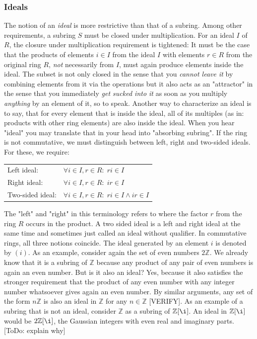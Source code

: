 \subsubsection{Ideals}
The notion of an \emph{ideal} is more restrictive than that of a subring. Among other requirements, a subring $S$ must be closed under multiplication. For an ideal $I$ of $R$, the closure under multiplication requirement is tightened: It must be the case that the products of elements $i \in I$ from the ideal $I$ with elements $r \in R$ from the original ring $R$, \emph{not} necessarily from $I$, must again produce elements inside the ideal. The subset is not only closed in the sense that you \emph{cannot leave it} by combining elements from it via the operations but it also acts as an "attractor" in the sense that you immediately \emph{get sucked into it} as soon as you multiply \emph{anything} by an element of it, so to speak. Another way to characterize an ideal is to say, that for every element that is inside the ideal, all of its multiples (as in: products with other ring elements) are also inside the ideal. When you hear "ideal" you may translate that in your head into "absorbing subring". If the ring is not commutative, we must distinguish between left, right and two-sided ideals. For these, we require:

\medskip
\begin{tabular}{l l}
Left ideal:      & $\forall i \in I, r \in R: \; r i \in I$  \\
Right ideal:     & $\forall i \in I, r \in R: \; i r \in I$  \\
Two-sided ideal: & $\forall i \in I, r \in R: \; r i \in I \wedge i r \in I$  \\
\end{tabular}
\medskip

The "left" and "right" in this terminology refers to where the factor $r$ from the ring $R$ occurs in the product. A two sided ideal is a left and right ideal at the same time and sometimes just called an ideal without qualifier. In commutative rings, all three notions coincide. The ideal generated by an element $i$ is denoted by $(i)$. As an example, consider again the set of even numbers $2 \mathbb{Z}$. We already know that it is a subring of $\mathbb{Z}$ because any product of any pair of even numbers is again an even number. But is it also an ideal? Yes, because it also satisfies the stronger requirement that the product of any even number with any integer number whatsoever gives again an even number. By similar arguments, any set of the form $n \mathbb{Z}$ is also an ideal in $\mathbb{Z}$ for any $n \in \mathbb{Z}$ [VERIFY]. As an example of a subring that is not an ideal, consider $\mathbb{Z}$ as a subring of $\mathbb{Z}[\i]$. An ideal in $\mathbb{Z}[\i]$ would be $2\mathbb{Z}[\i]$, the Gaussian integers with even real and imaginary parts. [ToDo: explain why]

